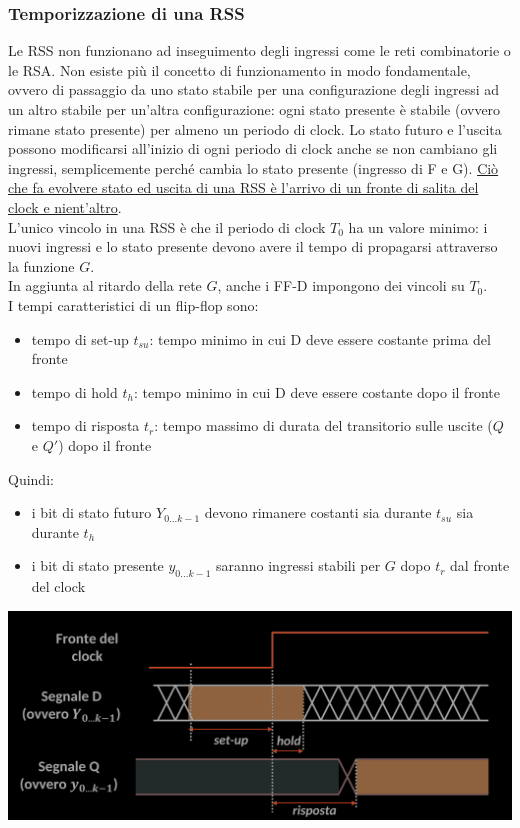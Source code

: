 \documentclass{article}
\begin{document}
\subsubsection{Temporizzazione di una RSS}
Le RSS non funzionano ad inseguimento degli ingressi come le reti combinatorie o le RSA. Non esiste più il concetto di funzionamento in modo fondamentale, ovvero di passaggio da uno stato stabile per una configurazione degli ingressi ad un altro stabile per un'altra configurazione: ogni stato presente è stabile (ovvero rimane stato presente) per almeno un periodo di clock. Lo stato futuro e l’uscita possono modificarsi all’inizio di ogni periodo di clock anche se non cambiano gli ingressi, semplicemente perché cambia lo stato presente (ingresso di F e G). \underline{Ciò che fa evolvere stato ed uscita di una RSS è l'arrivo di un fronte di salita del clock e nient’altro}.
\vspace{0.2cm}\\
L’unico vincolo in una RSS è che il periodo di clock $T_0$ ha un valore minimo: i nuovi ingressi e lo stato presente devono avere il tempo di propagarsi attraverso la funzione $G$.\\
In aggiunta al ritardo della rete $G$, anche i FF-D impongono dei vincoli su $T_0$.\\
I tempi caratteristici di un flip-flop sono:
\begin{itemize}
    \item tempo di set-up $t_{su}$: tempo minimo in cui D deve essere costante prima del fronte
    \item tempo di hold $t_h$: tempo minimo in cui D deve essere costante dopo il fronte
    \item tempo di risposta $t_r$: tempo massimo di durata del transitorio sulle uscite ($Q$ e $Q'$) dopo il fronte
\end{itemize}
Quindi:
\begin{itemize}
    \item i bit di stato futuro $Y_{0...k-1}$ devono rimanere costanti sia durante $t_{su}$ sia durante $t_h$
    \item i bit di stato presente $y_{0...k-1}$ saranno ingressi stabili per $G$ dopo $t_r$ dal fronte del clock
\end{itemize}
\begin{center}
    \includegraphics[scale=0.35]{periodo-t0-RSS.png}
\end{center}
\end{document}
